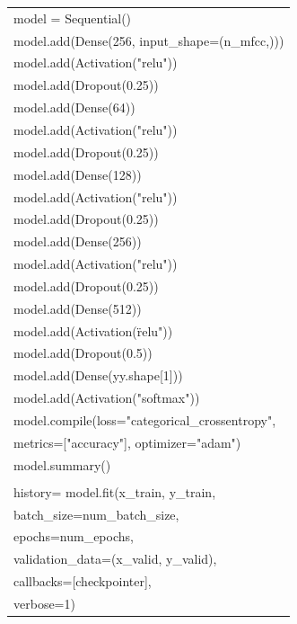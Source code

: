 \documentclass{article}
\begin{document}
\begin{center}
\begin{tabular}{ |l| }
 \hline
model =  Sequential() \\
model.add(Dense(256, input\_shape=(n\_mfcc,))) \\
model.add(Activation("relu")) \\
model.add(Dropout(0.25)) \\
model.add(Dense(64)) \\
model.add(Activation("relu")) \\
model.add(Dropout(0.25)) \\
model.add(Dense(128)) \\
model.add(Activation("relu")) \\
model.add(Dropout(0.25)) \\
model.add(Dense(256)) \\
model.add(Activation("relu")) \\
model.add(Dropout(0.25)) \\
model.add(Dense(512)) \\
model.add(Activation(\"relu")) \\
model.add(Dropout(0.5)) \\
model.add(Dense(yy.shape[1])) \\
model.add(Activation("softmax")) \\
model.compile(loss="categorical\_crossentropy", \\
            metrics=["accuracy"], optimizer="adam") \\
model.summary() \\
\\
history=  model.fit(x\_train, y\_train, \\
            batch_size=num\_batch_size, \\
            epochs=num\_epochs, \\
            validation_data=(x\_valid, y\_valid), \\
            callbacks=[checkpointer], \\
            verbose=1)\\
 \hline
\end{tabular}
\end{center}
\end{document}
